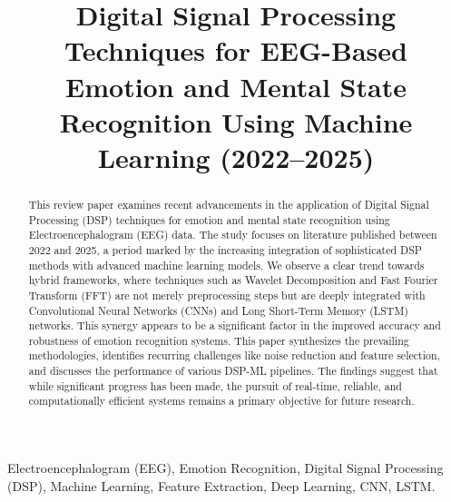 \documentclass[conference]{IEEEtran}
\begin{document}
\title{Digital Signal Processing Techniques for EEG-Based Emotion and Mental State Recognition Using Machine Learning (2022–2025)}

\author{
}

\maketitle

\begin{abstract} 
This review paper examines recent advancements in the application of Digital Signal Processing (DSP) techniques for emotion and mental state recognition using Electroencephalogram (EEG) data. The study focuses on literature published between 2022 and 2025, a period marked by the increasing integration of sophisticated DSP methods with advanced machine learning models. We observe a clear trend towards hybrid frameworks, where techniques such as Wavelet Decomposition and Fast Fourier Transform (FFT) are not merely preprocessing steps but are deeply integrated with Convolutional Neural Networks (CNNs) and Long Short-Term Memory (LSTM) networks. This synergy appears to be a significant factor in the improved accuracy and robustness of emotion recognition systems. This paper synthesizes the prevailing methodologies, identifies recurring challenges like noise reduction and feature selection, and discusses the performance of various DSP-ML pipelines. The findings suggest that while significant progress has been made, the pursuit of real-time, reliable, and computationally efficient systems remains a primary objective for future research.
\end{abstract}

\begin{IEEEkeywords}
Electroencephalogram (EEG), Emotion Recognition, Digital Signal Processing (DSP), Machine Learning, Feature Extraction, Deep Learning, CNN, LSTM.
\end{IEEEkeywords}
\end{document}
